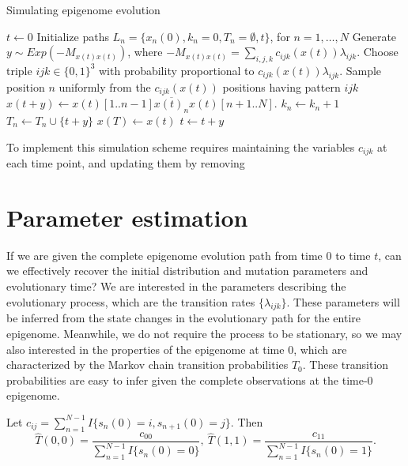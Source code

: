 \documentclass[11pt]{article}
\begin{document}
\begin{algorithm}[t]
\begin{algorithmic}[1]
  \caption{Simulating epigenome evolution}
  \STATE $t \leftarrow 0$
  \STATE Initialize paths $L_n = \{x_n(0), k_n=0, T_n=\emptyset, t\}$, for $n=1,\ldots, N$
  \STATE Generate $y\sim \mathit{Exp}(-M_{x(t)x(t)})$, where
  $-M_{x(t)x(t)} = \sum_{i,j,k}c_{ijk}(x(t))\lambda_{ijk}$.
  \STATE Choose triple $ijk \in \{0,1\}^3$ with probability proportional to $c_{ijk}(x(t))\lambda_{ijk}$.
  \STATE Sample position $n$ uniformly from the $c_{ijk}(x(t))$ positions having pattern $ijk$
  \STATE $x(t+y) \leftarrow x(t)[1..n-1]\overline{x(t)_n}x(t)[n+1..N]$.
  \STATE $k_n \leftarrow k_n + 1$ %
  \STATE $T_n \leftarrow T_n\cup \{t+y\}$
  \ELSE
  \STATE $x(T) \leftarrow x(t)$
  \ENDIF
  \STATE $t \leftarrow t+y$
  \ENDWHILE
\end{algorithmic}
\end{algorithm}

To implement this simulation scheme requires maintaining the variables
$c_{ijk}$ at each time point, and updating them by removing



\section{Parameter estimation}

If we are given the complete epigenome evolution path from time $0$ to
time $t$, can we effectively recover the initial distribution and
mutation parameters and evolutionary time? We are interested in the
parameters describing the evolutionary process, which are the
transition rates $\{\lambda_{ijk}\}$. These parameters will be
inferred from the state changes in the evolutionary path for the
entire epigenome. Meanwhile, we do not require the process to be
stationary, so we may also interested in the properties of the
epigenome at time 0, which are characterized by the Markov chain
transition probabilities $T_{0}$. These transition probabilities are
easy to infer given the complete observations at the time-0 epigenome.

Let $c_{ij} = \sum_{n=1}^{N-1}I\{s_n(0) =i, s_{n+1}(0)=j\}$. Then
\[
\hat{T}(0, 0) = \frac{c_{00}}{\sum_{n=1}^{N-1}I\{s_n(0) = 0\}}, ~
\hat{T}(1,1) = \frac{c_{11}}{\sum_{n=1}^{N-1}I\{s_n(0) = 1\}}.
\]
\end{document}
